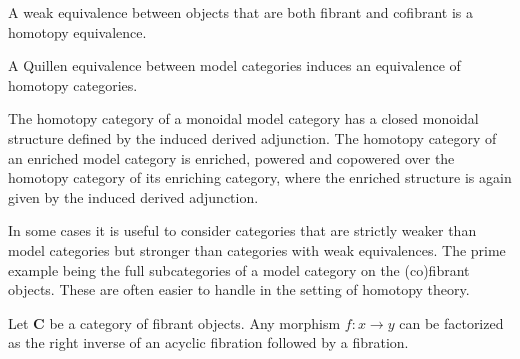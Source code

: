     \begin{theorem}[Whitehead]
        A weak equivalence between objects that are both fibrant and cofibrant is a homotopy equivalence.
    \end{theorem}

    \begin{property}
        A Quillen equivalence between model categories induces an equivalence of homotopy categories.
    \end{property}

    \begin{property}
        The homotopy category of a monoidal model category has a closed monoidal structure defined by the induced derived adjunction. The homotopy category of an enriched model category is enriched, powered and copowered over the homotopy category of its enriching category, where the enriched structure is again given by the induced derived adjunction.
    \end{property}

    In some cases it is useful to consider categories that are strictly weaker than model categories but stronger than categories with weak equivalences. The prime example being the full subcategories of a model category on the (co)fibrant objects. These are often easier to handle in the setting of homotopy theory.

    \begin{theorem}
        Let $\mathbf{C}$ be a category of fibrant objects. Any morphism $f:x\rightarrow y$ can be factorized as the right inverse of an acyclic fibration followed by a fibration.
    \end{theorem}

